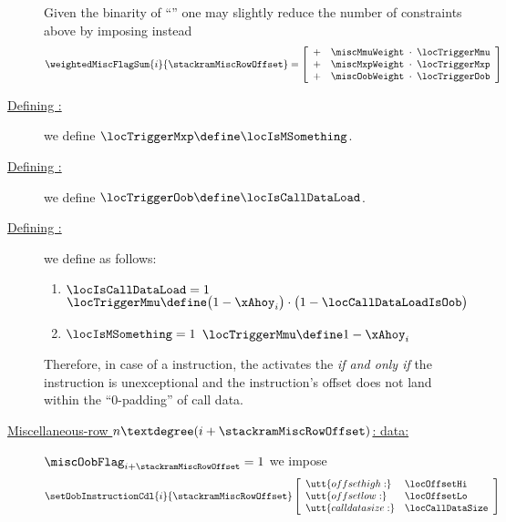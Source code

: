 \begin{description}
		\saNote{} \label{hub: instruction handling: stack ram: constraints: optimized misc flags}
		Given the binarity of ``\locTriggerXxx{}'' one may slightly reduce the number of constraints above by imposing instead
		\[
			\weightedMiscFlagSum {i}{\stackramMiscRowOffset}
			=
			\left[ \begin{array}{crcl}
				+ & \miscMmuWeight & \!\!\! \cdot \!\!\! & \locTriggerMmu \\
				+ & \miscMxpWeight & \!\!\! \cdot \!\!\! & \locTriggerMxp \\
				+ & \miscOobWeight & \!\!\! \cdot \!\!\! & \locTriggerOob \\
			\end{array} \right]
		\]
	\item[\underline{Defining \locTriggerMxp{}:}] we define
		$\locTriggerMxp \define \locIsMSomething$.
	\item[\underline{Defining \locTriggerOob{}:}] we define
		$\locTriggerOob \define \locIsCallDataLoad$.
	\item[\underline{Defining \locTriggerMmu{}:}] we define \locTriggerMmu{} as follows:
		\begin{enumerate}
			\item \If $\locIsCallDataLoad = 1$ \Then
				\(
					\locTriggerMmu \define
					\big( 1 -  \xAhoy_{i} \big)
					\cdot
					\big( 1 - \locCallDataLoadIsOob \big)
				\)
			\item \If $\locIsMSomething = 1$ \Then
				\(
					\locTriggerMmu \define
					1 - \xAhoy_{i}
				\)
		\end{enumerate}
		\saNote{}
		Therefore, in case of a  instruction,
		the \zkEvm{} activates the \mmuMod{} \emph{if and only if}
		the instruction is unexceptional and the instruction's offset does not land within the ``$0$-padding'' of call data.
	\item[\underline{Miscellaneous-row $n°(i + \stackramMiscRowOffset)$: \oobMod{} data:}]
		\If $\miscOobFlag _{i + \stackramMiscRowOffset} = 1$ \Then we impose
		\[
			\setOobInstructionCdl {i}{\stackramMiscRowOffset}
			\left[ \begin{array}{ll}
				\utt{offset high:}    & \locOffsetHi     \\
				\utt{offset low:}     & \locOffsetLo     \\
				\utt{call data size:} & \locCallDataSize \\
			\end{array} \right] \vspace{2mm} \\
\]
\end{description}
